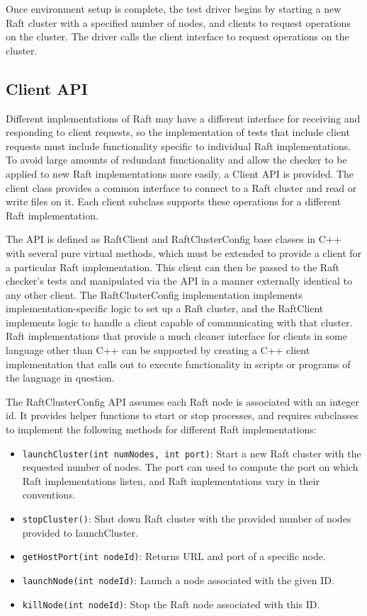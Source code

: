 \documentclass[UTF8]{article}
\begin{document}
Once environment setup is complete, the test driver begins by starting a new Raft cluster with a specified number of nodes, and clients to request operations on the cluster. The driver calls the client interface to request operations on the cluster.

\subsection{Client API}

Different implementations of Raft may have a different interface for receiving and responding to client requests, so the implementation of tests that include client requests must include functionality specific to individual Raft implementations. To avoid large amounts of redundant functionality and allow the checker to be applied to new Raft implementations more easily, a Client API is provided. The client class provides a common interface to connect to a Raft cluster and read or write files on it. Each client subclass supports these operations for a different Raft implementation.

The API is defined as RaftClient and RaftClusterConfig base classes in C++ with several pure virtual methods, which must be extended to provide a client for a particular Raft implementation. This client can then be passed to the Raft checker's tests and manipulated via the API in a manner externally identical to any other client. The RaftClusterConfig implementation implements implementation-specific logic to set up a Raft cluster, and the RaftClient implements logic to handle a client capable of communicating with that cluster. Raft implementations that provide a much cleaner interface for clients in some language other than C++ can be supported by creating a C++ client implementation that calls out to execute functionality in scripts or programs of the language in question.

The RaftClusterConfig API assumes each Raft node is associated with an integer id. It provides helper functions to start or stop processes, and requires subclasses to implement the following methods for different Raft implementations:

\begin{itemize}
\item \texttt{launchCluster(int numNodes, int port)}: Start a new Raft cluster with the requested number of nodes. The port can used to compute the port on which Raft implementations listen, and Raft implementations vary in their conventions.
\item \texttt{stopCluster()}: Shut down Raft cluster with the provided number of nodes provided to launchCluster.
\item \texttt{getHostPort(int nodeId)}: Returns URL and port of a specific node.
\item \texttt{launchNode(int nodeId)}: Launch a node associated with the given ID.
\item \texttt{killNode(int nodeId)}: Stop the Raft node associated with this ID.
\end{itemize}
\end{document}

